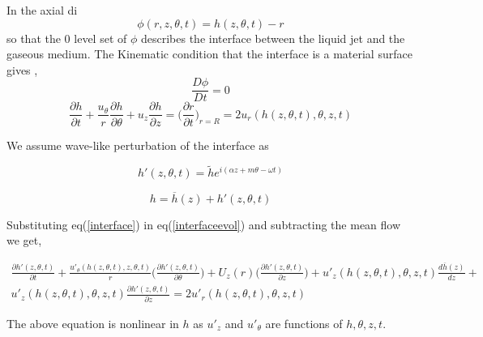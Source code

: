 \documentclass{article}
\begin{document}
In the axial di\begin{equation}
\phi(r,z,\theta,t) = h(z,\theta,t) - r
\end{equation}
so that the 0 level set of $\phi $ describes the interface between the liquid jet and the gaseous medium. The  Kinematic  condition that the interface is a material surface gives ,
\begin{equation}
\frac{D\phi}{Dt} = 0
\end{equation}
\begin{equation}
\label{interfaceevol}
\frac{\partial{h}}{\partial{t}} + \frac{u_{\theta}}{r}\frac{\partial{h}}{\partial{\theta}} + u_{z}\frac{\partial{h}}{\partial{z}} = \Bigg(\frac{\partial{r}}{\partial{t}}\Bigg)_{r=R} = 2u_{r}(h(z,\theta,t),\theta ,z,t)
\end{equation}

We assume wave-like perturbation of the interface as 

\begin{equation}
\label{interface}
h'(z,\theta,t) = \tilde{h}e^{i(\alpha z + m\theta - \omega t)}
 \end{equation}


\begin{equation}
h = \overline h(z) + h'(z,\theta,t)
\end{equation}

Substituting eq(\ref{interface}) in eq(\ref{interfaceevol}) and subtracting the mean flow  we get,

\begin{equation}
\begin{split}
\frac{\partial h'(z,\theta ,t)}{\partial t} + \frac{u'_{\theta}(h(z,\theta, t),z,\theta,t)}{r}\bigg(\frac{\partial h'(z ,\theta,t)}{\partial \theta}\bigg)  +  U_{z}(r)\bigg(\frac{\partial h'(z,\theta ,t)}{\partial z}\bigg) + u'_{z}(h(z,\theta,t),\theta,z,t)\frac{d\overline{h}(z)}{dz} + \\
 u'_{z}(h(z,\theta,t),\theta,z,t)\frac{\partial h'(z,\theta,t)}{\partial z} =  2u'_{r}(h(z,\theta,t),\theta ,z,t)
\end{split}
\end{equation}


The above equation is nonlinear in $h$ as $ u'_{z}$ and $ u'_{\theta}$ are functions of $ h,\theta,z,t$.

\end{document}
